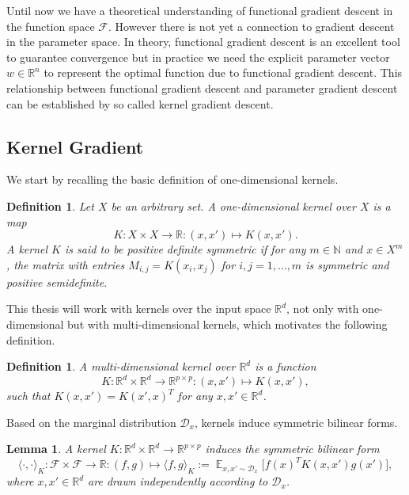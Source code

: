 \documentclass[11pt, a4paper]{article}
\newtheorem{lemma}[theorem]{Lemma}
\newtheorem{definition}[theorem]{Definition}
\newcommand{\N}{\mathds{N}}
\newcommand{\R}{\mathds{R}}
\newcommand{\D}{\mathcal{D}}
\newcommand{\F}{\mathcal{F}}
\DeclareMathOperator*{\E}{\mathds{E}}
\begin{document}
Until now we have a theoretical understanding of functional gradient descent in the function space $\F$. However there is not yet a connection to gradient descent in the parameter space. In theory, functional gradient descent is an excellent tool to guarantee convergence but in practice we need the explicit parameter vector $w \in \R^n$ to represent the optimal function due to functional gradient descent. This relationship between functional gradient descent and parameter gradient descent can be established by so called kernel gradient descent. 

\subsection{Kernel Gradient}

We start by recalling the basic definition of one-dimensional kernels.

\begin{definition}
Let $X$ be an arbitrary set. A one-dimensional kernel over $X$ is a map 
\[ K: X \times X \to \R : (x,x') \mapsto K(x,x').\]
A kernel $K$ is said to be positive definite symmetric if for any $m \in \N$ and $x \in X^m$, the matrix with entries $M_{i,j} = K(x_i,x_j)$ for $i,j = 1, \dots, m$ is symmetric and positive semidefinite.
\end{definition}

This thesis will work with kernels over the input space $\R^d$, not only with one-dimensional but with multi-dimensional kernels, which motivates the following definition.

\begin{definition}
A multi-dimensional kernel over $\R^d$ is a function
\[ K: \R^d \times \R^d \to \R^{p \times p} : (x,x') \mapsto K(x,x'), \]
such that $K(x,x') = K(x',x)^T$ for any $x,x' \in \R^d$.
\end{definition}

Based on the marginal distribution $\D_x$, kernels induce symmetric bilinear forms.

\begin{lemma} \label{lem:form}
A kernel $K: \R^d \times \R^d \to \R^{p \times p}$ induces the symmetric bilinear form
\[ \langle \cdot, \cdot \rangle_K : \F \times \F \to \R : (f,g) \mapsto \langle f , g \rangle _K := \E_{x,x' \sim \D_x} \Big [ f(x)^T K(x,x') g(x') \Big ], \]
where $x, x' \in \R^d$ are drawn independently according to $\D_x$. 
\end{lemma}
\end{document}
